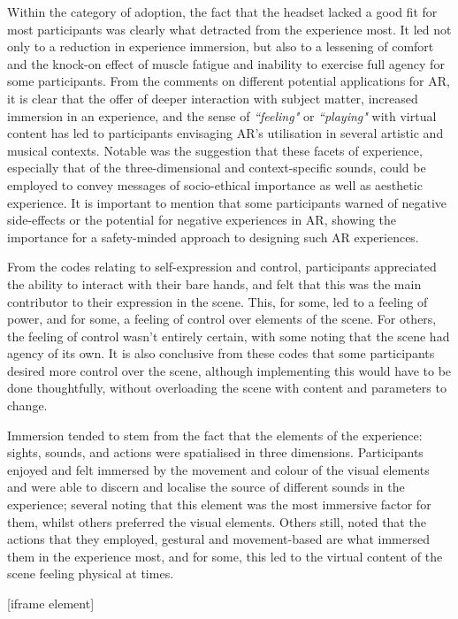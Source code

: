 Within the category of adoption, the fact that the headset lacked a good fit for most participants was clearly what detracted from the experience most. It led not only to a reduction in experience immersion, but also to a lessening of comfort and the knock-on effect of muscle fatigue and inability to exercise full agency for some participants. From the comments on different potential applications for AR, it is clear that the offer of deeper interaction with subject matter, increased immersion in an experience, and the sense of \textit{``feeling"} or \textit{``playing"} with virtual content has led to participants envisaging AR’s utilisation in several artistic and musical contexts. Notable was the suggestion that these facets of experience, especially that of the three-dimensional and context-specific sounds, could be employed to convey messages of socio-ethical importance as well as aesthetic experience. It is important to mention that some participants warned of negative side-effects or the potential for negative experiences in AR, showing the importance for a safety-minded approach to designing such AR experiences.

From the codes relating to self-expression and control, participants appreciated the ability to interact with their bare hands, and felt that this was the main contributor to their expression in the scene. This, for some, led to a feeling of power, and for some, a feeling of control over elements of the scene. For others, the feeling of control wasn’t entirely certain, with some noting that the scene had agency of its own. It is also conclusive from these codes that some participants desired more control over the scene, although implementing this would have to be done thoughtfully, without overloading the scene with content and parameters to change.

Immersion tended to stem from the fact that the elements of the experience: sights, sounds, and actions were spatialised in three dimensions. Participants enjoyed and felt immersed by the movement and colour of the visual elements and were able to discern and localise the source of different sounds in the experience; several noting that this element was the most immersive factor for them, whilst others preferred the visual elements. Others still, noted that the actions that they employed, gestural and movement-based are what immersed them in the experience most, and for some, this led to the virtual content of the scene feeling physical at times.

[iframe element]

